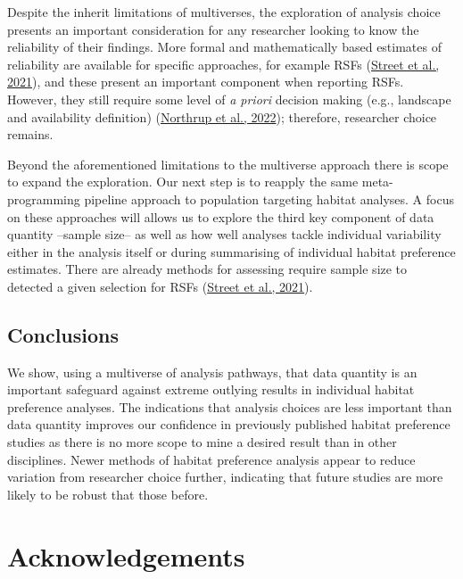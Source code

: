 \documentclass[10pt,a4paper]{article}
\begin{document}
Despite the inherit limitations of multiverses, the exploration of analysis choice presents an important consideration for any researcher looking to know the reliability of their findings.
More formal and mathematically based estimates of reliability are available for specific approaches, for example RSFs (\protect\hyperlink{ref-street_solving_2021}{Street et al., 2021}), and these present an important component when reporting RSFs.
However, they still require some level of \emph{a priori} decision making (e.g., landscape and availability definition) (\protect\hyperlink{ref-northrup_conceptual_2022}{Northrup et al., 2022}); therefore, researcher choice remains.

Beyond the aforementioned limitations to the multiverse approach there is scope to expand the exploration.
Our next step is to reapply the same meta-programming pipeline approach to population targeting habitat analyses.
A focus on these approaches will allows us to explore the third key component of data quantity --sample size-- as well as how well analyses tackle individual variability either in the analysis itself or during summarising of individual habitat preference estimates.
There are already methods for assessing require sample size to detected a given selection for RSFs (\protect\hyperlink{ref-street_solving_2021}{Street et al., 2021}).

\hypertarget{conclusions}{%
\subsection{Conclusions}\label{conclusions}}

We show, using a multiverse of analysis pathways, that data quantity is an important safeguard against extreme outlying results in individual habitat preference analyses.
The indications that analysis choices are less important than data quantity improves our confidence in previously published habitat preference studies as there is no more scope to mine a desired result than in other disciplines.
Newer methods of habitat preference analysis appear to reduce variation from researcher choice further, indicating that future studies are more likely to be robust that those before.

\clearpage

\hypertarget{acknowledgements}{%
\section{Acknowledgements}\label{acknowledgements}}
\end{document}
